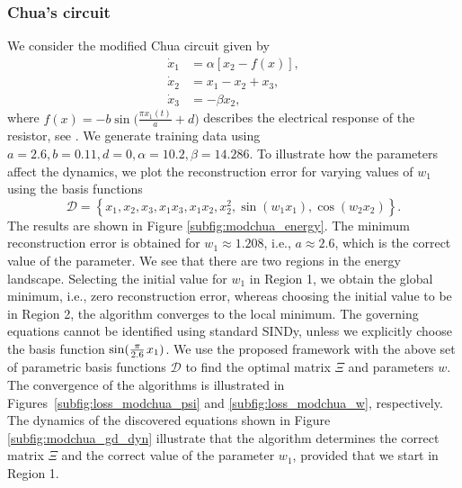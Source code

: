 \documentclass
[
    a4paper,
    DIV=11,
    abstract=true,
    11pt,
]
{scrartcl}
\newcommand{\ts}{\hspace*{0.1em}}                                %
\theoremstyle{definition}
\begin{document}
\subsubsection{Chua's circuit}

We consider the modified Chua circuit \cite{mishra2019modified} given by
\begin{equation*}
\begin{split}
    \dot{x}_1 &= \alpha[x_2 - f(x)], \\
    \dot{x}_2 &= x_1 - x_2 + x_3, \\
    \dot{x}_3 &= -\beta x_2,
\end{split}
\end{equation*}
where $f(x) = -b \sin\big(\frac{\pi x_1(t)}{a} + d\big)$ describes the electrical response of the resistor, see \cite{madan1993chua, kilicc2010practical}. We generate training data using $a = 2.6, b = 0.11, d = 0, \alpha = 10.2, \beta = 14.286$. To illustrate how the parameters affect the dynamics, we plot the reconstruction error for varying values of $w_1$ using the basis functions
\begin{equation*}
    \mathcal{D} = \left\{x_1, x_2, x_3, x_1 x_3, x_1 x_2, x_2^2, \sin(w_1 x_1), \cos(w_2 x_2) \right\}.
\end{equation*}
The results are shown in Figure \ref{subfig:modchua_energy}. The minimum reconstruction error is obtained for $w_1 \approx 1.208$, i.e., $a \approx 2.6$, which is the correct value of the parameter. We see that there are two regions in the energy landscape. Selecting the initial value for $w_1$ in Region 1, we obtain the global minimum, i.e., zero reconstruction error, whereas choosing the initial value to be in Region 2, the algorithm converges to the local minimum. The governing equations cannot be identified using standard SINDy, unless we explicitly choose the basis function $ \sin(\frac{\pi}{2.6} \ts x_1) $. We use the proposed framework with the above set of parametric basis functions $\mathcal{D}$ to find the optimal matrix $\Xi$ and parameters $w$. The convergence of the algorithms is illustrated in Figures~\ref{subfig:loss_modchua_psi} and \ref{subfig:loss_modchua_w}, respectively. The dynamics of the discovered equations shown in Figure \ref{subfig:modchua_gd_dyn} illustrate that the algorithm determines the correct matrix $\Xi$ and the correct value of the parameter $w_1$, provided that we start in Region 1.
\end{document}
